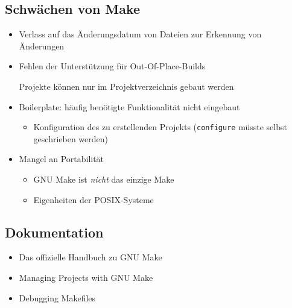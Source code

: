
\subsection{Schwächen von Make}
\begin{frame}
	\begin{itemize}
		\item Verlass auf das Änderungsdatum von Dateien zur Erkennung von Änderungen
		\item Fehlen der Unterstützung für Out-Of-Place-Builds

			Projekte können nur im Projektverzeichnis gebaut werden
		\item Boilerplate: häufig benötigte Funktionalität nicht eingebaut
			\begin{itemize}
				\item Konfiguration des zu erstellenden Projekts (\texttt{configure} müsste selbst geschrieben werden)
			\end{itemize}
		\item Mangel an Portabilität
			\begin{itemize}
				\item GNU Make ist \emph{nicht} das einzige Make
				\item Eigenheiten der POSIX-Systeme
			\end{itemize}
	\end{itemize}
\end{frame}

\subsection{Dokumentation}
\begin{frame}
	\begin{itemize}
	\item Das offizielle Handbuch zu GNU Make \cite{GNU_Make_manual}
	\item Managing Projects with GNU Make \cite{OreillyMake}
	\item Debugging Makefiles \cite{DobbsDebuggingMakefiles}
	\end{itemize}
\end{frame}
